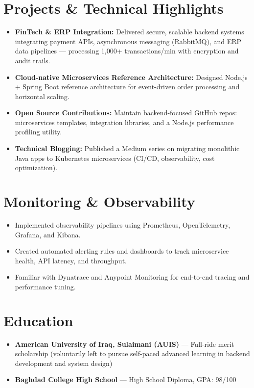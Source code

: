 \documentclass[10pt, a4paper]{article}
\begin{document}
\section*{Projects \& Technical Highlights}
\begin{itemize}
    \item \textbf{FinTech \& ERP Integration:} Delivered secure, scalable backend systems integrating payment APIs, asynchronous messaging (RabbitMQ), and ERP data pipelines — processing 1,000+ transactions/min with encryption and audit trails.
    \item \textbf{Cloud-native Microservices Reference Architecture:} Designed Node.js + Spring Boot reference architecture for event-driven order processing and horizontal scaling.
    \item \textbf{Open Source Contributions:} Maintain backend-focused GitHub repos: microservices templates, integration libraries, and a Node.js performance profiling utility.
    \item \textbf{Technical Blogging:} Published a Medium series on migrating monolithic Java apps to Kubernetes microservices (CI/CD, observability, cost optimization).
\end{itemize}

\section*{Monitoring \& Observability}
\begin{itemize}
    \item Implemented observability pipelines using Prometheus, OpenTelemetry, Grafana, and Kibana.
    \item Created automated alerting rules and dashboards to track microservice health, API latency, and throughput.
    \item Familiar with Dynatrace and Anypoint Monitoring for end-to-end tracing and performance tuning.
\end{itemize}

\section*{Education}
\begin{itemize}
    \item \textbf{American University of Iraq, Sulaimani (AUIS)} — Full-ride merit scholarship (voluntarily left to pursue self-paced advanced learning in backend development and system design)
    \item \textbf{Baghdad College High School} — High School Diploma, GPA: 98/100
\end{itemize}
\end{document}

